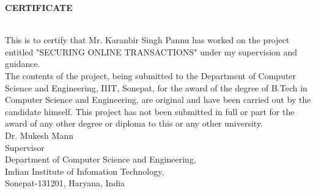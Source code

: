 \documentclass[12pt, oneside, a4paper]{article}
\begin{document}
\begin{center}
    \begin{Large}\textbf{CERTIFICATE}\end{Large}
\end{center}\\
\vspace{1cm}
This is to certify that Mr. Karanbir Singh Pannu has worked on the project entitled "SECURING ONLINE TRANSACTIONS" under my supervision and guidance.
\vspace{0.5cm}\\
The contents of the project, being submitted to the Department of Computer Science and Engineering, IIIT, Sonepat, for the award of the degree of B.Tech in Computer Science and Engineering, are original and have been carried out by the candidate himself. This project has not been submitted in full or part for the award of any other degree or diploma to this or any other university.
\vspace{4cm}\\
Dr. Mukesh Mann\\
Supervisor
\vspace{5cm}\\
Department of Computer Science and Engineering,\\
Indian Institute of Infomation Technology,\\
Sonepat-131201, Haryana, India
\pagebreak
\end{document}
